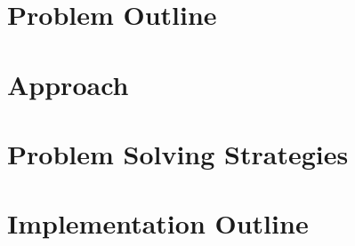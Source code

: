 \documentclass[12pt, letterpaper]{article}
\begin{document}
\section{Problem Outline}
\label{sec:problem}



\section{Approach}
\label{sec:approach}

\section{Problem Solving Strategies}
\label{sec:strategies}

\section{Implementation Outline}
\label{sec:implementation}
\end{document}

